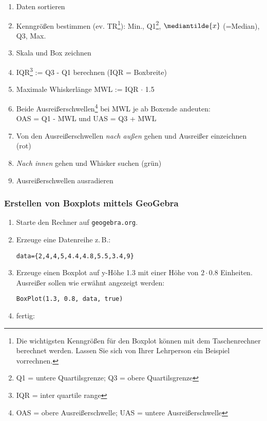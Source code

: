 \begin{rezept}{}{}
  \begin{enumerate}
    \item Daten sortieren
  \item Kenngrößen bestimmen (ev. TR\footnote{Die wichtigsten Kenngrößen für den Boxplot können mit dem Taschenrechner berechnet werden. Lassen Sie sich von Ihrer Lehrperson ein Beispiel vorrechnen.}): Min., Q1\footnote{Q1 = untere
    Quartilsgrenze; Q3 = obere Quartilsgrenze}, $\mediantilde{x}$ (=Median),  Q3, Max.
  \item Skala und Box zeichnen
  \item IQR\footnote{IQR = inter quartile range} := Q3 - Q1
    berechnen (IQR = Boxbreite)
    \item Maximale Whiskerlänge MWL := IQR $\cdot{}$ 1.5
  \item Beide Ausreißerschwellen\footnote{OAS = obere Ausreißerschwelle; UAS = untere Ausreißerschwelle} bei MWL je ab Boxende andeuten:\\
    OAS =
    Q1 - MWL und UAS = Q3 + MWL
  \item Von den Ausreißerschwellen \textit{nach außen} gehen und
    Ausreißer einzeichnen (rot)
  \item \textit{Nach innen} gehen und Whisker suchen (grün)
  \item Ausreißerschwellen ausradieren
  \end{enumerate}
\end{rezept}
\newpage


\subsubsection{Erstellen von Boxplots mittels GeoGebra}
\begin{enumerate}
\item Starte den Rechner auf \texttt{geogebra.org}.
\item Erzeuge eine Datenreihe z.\,B.:

\texttt{data=\{2,4,4,5,4.4,4.8,5.5,3.4,9\}}


\item Erzeuge einen Boxplot auf y-Höhe 1.3 mit einer Höhe von
  $2\cdot{}0.8$ Einheiten. Ausreißer sollen wie erwähnt angezeigt
  werden:

  \texttt{BoxPlot(1.3, 0.8, data, true)}

\item fertig:


  
\end{enumerate}

